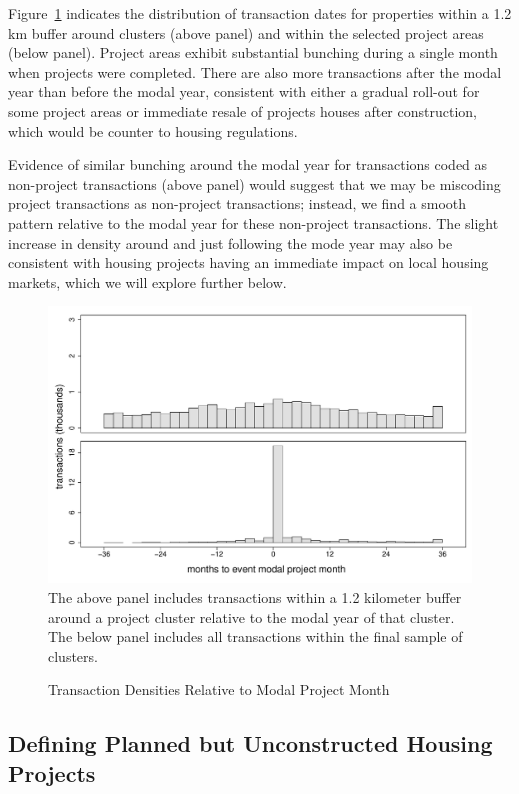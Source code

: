 \documentclass[12pt]{article}
\begin{document}
Figure~\ref{figure:densitytime} indicates the distribution of transaction dates for properties within a 1.2 km buffer around clusters (above panel) and within the selected project areas (below panel).  Project areas exhibit substantial bunching during a single month when projects were completed.  There are also more transactions after the modal year than before the modal year, consistent with either a gradual roll-out for some project areas or immediate resale of projects houses after construction, which would be counter to housing regulations.  

Evidence of similar bunching around the modal year for transactions coded as non-project transactions (above panel) would suggest that we may be miscoding project transactions as non-project transactions; instead, we find a smooth pattern relative to the modal year for these non-project transactions.  The slight increase in density around and just following the mode year may also be consistent with housing projects having an immediate impact on local housing markets, which we will explore further below.

\begin{figure}
\caption{Transaction Densities Relative to Modal Project Month}\label{figure:densitytime}
\centering
\includegraphics[scale=.5]{figures/summary_densitytime.pdf} \\
The above panel includes transactions within a 1.2 kilometer buffer around a project cluster relative to the modal year of that cluster.  The below panel includes all transactions within the final sample of clusters.
\end{figure}


\subsection{Defining Planned but Unconstructed Housing Projects}
\end{document}
